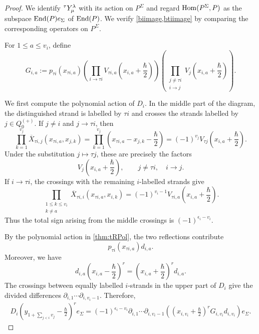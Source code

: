 \begin{proof}
We identify ${}^\tau Y_\mu^\lambda$ with its action on $P^\Sigma$ and regard
$\operatorname{Hom}(P^\Sigma,P)$ as the subspace $\operatorname{End}(P)e_\Sigma$ of $\operatorname{End}(P)$.
We verify \cref{biimage,btiimage} by comparing the corresponding
operators on $P^\Sigma$.

For $1\leq a\leq v_i$, define
\[
G_{i,a}
:=
p_{\tau i}(x_{\tau i,a})
\left(
\prod_{i\to\tau i}
V_{\tau i,a}
\left(x_{i,a}+\frac{\hbar}{2}\right)
\right)
\left(
\prod_{\substack{j\neq\tau i\\i\to j}}
V_j
\left(x_{i,a}+\frac{\hbar}{2}\right)
\right).
\]

We first compute the polynomial action of $D_i$. In the middle part of
the diagram, the distinguished strand is labelled by $\tau i$ and
crosses the strands labelled by $j\in Q_0^{(+)}$. If $j\neq i$ and
$j\to\tau i$, then
\[
\prod_{k=1}^{v_j}
\overline X_{\tau i,j}
(x_{\tau i,a},x_{j,k})
=
\prod_{k=1}^{v_j}
\left(
x_{\tau i,a}-x_{j,k}-\frac{\hbar}{2}
\right)
=
(-1)^{v_j}
V_{\tau j}
\left(x_{i,a}+\frac{\hbar}{2}\right).
\]
Under the substitution $j\mapsto\tau j$, these are precisely the
factors
\[
V_j\left(x_{i,a}+\frac{\hbar}{2}\right),
\qquad
j\neq\tau i,\quad i\to j.
\]
If $i\to\tau i$, the crossings with the remaining $i$-labelled strands
give
\[
\prod_{\substack{1\leq k\leq v_i\\k\neq a}}
\overline X_{\tau i,i}
(x_{\tau i,a},x_{i,k})
=
(-1)^{v_i-1}
V_{\tau i,a}
\left(x_{i,a}+\frac{\hbar}{2}\right).
\]
Thus the total sign arising from the middle crossings is
\(
(-1)^{\epsilon_i-v_i}.
\)

By the polynomial action in \cref{thm:tRPol}, the two
reflections contribute
\[
p_{\tau i}(x_{\tau i,a})d_{i,a}.
\]
Moreover, we have
\[
d_{i,a}
\left(x_{i,a}-\frac{\hbar}{2}\right)^r
=
\left(x_{i,a}+\frac{\hbar}{2}\right)^r d_{i,a}.
\]
The crossings between equally labelled $i$-strands in the upper part
of $D_i$ give the divided differences
$\partial_{i,1}\cdots\partial_{i,v_i-1}$. Therefore,
\begin{align}
\label{eq:Di-action}
D_i
\left(
y_{1+\sum_{j<i}v_j}-\frac{\hbar}{2}
\right)^r e_\Sigma
=
(-1)^{\epsilon_i-v_i}
\partial_{i,1}\cdots\partial_{i,v_i-1}
\left(
\left(x_{i,v_i}+\frac{\hbar}{2}\right)^r
G_{i,v_i}d_{i,v_i}
\right)e_\Sigma.
\end{align}


\end{proof}
